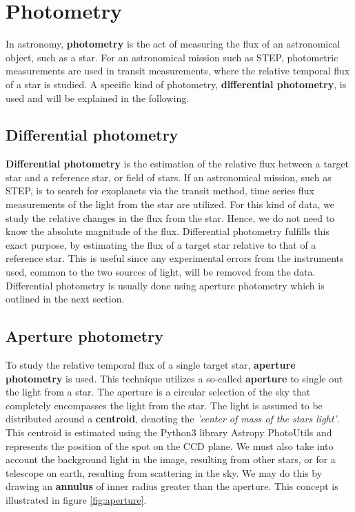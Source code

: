 \documentclass[../main.tex]{subfiles}
\begin{document}
\section{Photometry}
In astronomy, \textbf{photometry} is the act of measuring the flux of an astronomical object, such as a star. For an astronomical mission such as STEP, photometric measurements are used in transit measurements, where the relative temporal flux of a star is studied. A specific kind of photometry, \textbf{differential photometry}, is used and will be explained in the following. 

\subsection{Differential photometry}\label{sec:diffphot}
\textbf{Differential photometry} is the estimation of the relative flux between a target star and a reference star, or field of stars. If an astronomical mission, such as STEP, is to search for exoplanets via the transit method, time series flux measurements of the light from the star are utilized. For this kind of data, we study the relative changes in the flux from the star. Hence, we do not need to know the absolute magnitude of the flux. Differential photometry fulfills this exact purpose, by estimating the flux of a target star relative to that of a reference star. This is useful since any experimental errors from the instruments used, common to the two sources of light, will be removed from the data. Differential photometry is usually done using aperture photometry which is outlined in the next section.

\subsection{Aperture photometry}\label{sect:apphotmeth}
To study the relative temporal flux of a single target star, \textbf{aperture photometry} is used. This technique utilizes a so-called \textbf{aperture} to single out the light from a star. The aperture is a circular selection of the sky that completely encompasses the light from the star. The light is assumed to be distributed around a \textbf{centroid}, denoting the \textit{'center of mass of the stars light'}. This centroid is estimated using the Python3 library Astropy PhotoUtils\cite{larry_bradley_2020_4044744} and represents the position of the spot on the CCD plane. We must also take into account the background light in the image, resulting from other stars, or for a telescope on earth, resulting from scattering in the sky. We may do this by drawing an \textbf{annulus} of inner radius greater than the aperture. This concept is illustrated in figure \ref{fig:aperture}.
\end{document}
